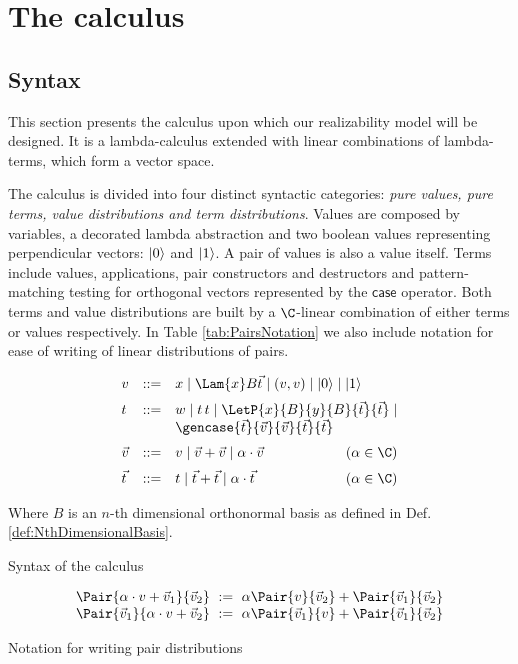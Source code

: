 \section{The calculus}
\subsection{Syntax}

This section presents the calculus upon which our realizability model will be designed. It is a lambda-calculus extended with linear combinations of lambda-terms, which form a vector space.

The calculus is divided into four distinct syntactic categories: \textit{pure values, pure terms, value distributions and term distributions}. Values are composed by variables, a decorated lambda abstraction and two boolean values representing perpendicular vectors: $\ket 0$ and $\ket 1$. A pair of values is also a value itself. Terms include values, applications, pair constructors and destructors and pattern-matching testing for orthogonal vectors represented by the $\mathsf{case}$ operator. Both terms and value distributions are built by a $\C$-linear combination of either terms or values respectively. In Table \ref{tab:PairsNotation} we also include notation for ease of writing of linear distributions of pairs.


\begin{table*}[t]
  \small
  \[\begin{array}{l@{\quad}rll@{}}
    v&::=& x \mid \Lam{x}B{\vec{t}} \mid (v, v) \mid\ket{0} \mid \ket{1} \\[6pt]
    t&::=& w \mid  t\,t \mid \LetP{x}{B}{y}{B}{\vec{t}}{\vec{t}} 
    \mid\\
    &&\gencase{\vec{t}}{\vec{v}}{\vec{v}}{\vec{t}}{\vec{t}}\\[6pt]
    \vec{v}&::=& v \mid \vec{v}+\vec{v} \mid 
    \alpha\cdot\vec{v}\qquad\hfill(\alpha\in\C)\\[6pt]
    \vec{t}&::=&
    t \mid \vec{t}+\vec{t} \mid 
    \alpha\cdot\vec{t}\qquad\hfill(\alpha\in\C)
   \end{array}
  \]
   
  Where $B$ is an $n$-th dimensional orthonormal basis as defined in Def. \ref{def:NthDimensionalBasis}.

  \caption{Syntax of the calculus}
  \label{tab:Syntax}
\end{table*}

 \begin{table*}[tb]
  \[
    \begin{array}{c}
      \Pair{\alpha\cdot v+\vec{v}_1}{\vec{v}_2}~ := ~\alpha\Pair{v}{\vec{v}_2} + \Pair{\vec{v}_1}{\vec{v}_2}\\
      \Pair{\vec{v}_1}{\alpha\cdot v+\vec{v}_2}~ := ~\alpha\Pair{\vec{v}_1}{v} + \Pair{\vec{v}_1}{\vec{v}_2}
    \end{array}
  \]
  \caption{Notation for writing pair distributions}
  \label{tab:PairsNotation}
 \end{table*}

